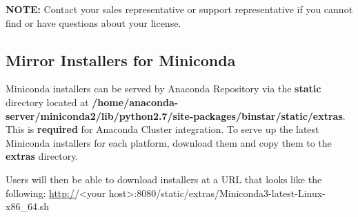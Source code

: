 \documentclass[letterpaper,10pt,openany,oneside]{sphinxmanual}
\begin{document}
\textbf{NOTE:} Contact your sales representative or support representative if
you cannot find or have questions about your license.


\subsection{Mirror Installers for Miniconda}
\label{AnacondaRepository:mirror-installers-for-miniconda}
Miniconda installers can be served by Anaconda Repository via the \textbf{static}
directory located at
\textbf{/home/anaconda-server/miniconda2/lib/python2.7/site-packages/binstar/static/extras}.
This is \textbf{required} for Anaconda Cluster integration. To serve up the
latest Miniconda installers for each platform, download them and copy
them to the \textbf{extras} directory.

Users will then be able to download installers at a URL that looks like the
following: \url{http:/}/\textless{}your host\textgreater{}:8080/static/extras/Miniconda3-latest-Linux-x86\_64.sh
\end{document}
